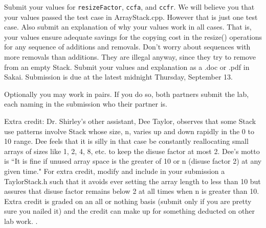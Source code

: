 \documentclass[]{article}
\begin{document}
Submit your values for \verb|resizeFactor|, \verb|ccfa|, and \verb|ccfr|.  We will believe you that your values passed the test case in ArrayStack.cpp.  However that is just one test case.  Also submit an explanation of why your values work in all cases.  That is, your values ensure adequate savings for the copying cost in the resize() operations for any sequence of additions and removals.  Don't worry about sequences with more removals than additions.  They are illegal anyway, since they try to remove from an empty Stack.  Submit your values and explanation as a .doc or .pdf in Sakai.
Submission is due at the latest midnight Thursday, September 13.

Optionally you may work in pairs.  If you do so, both partners submit the lab, each naming in the submission who their partner is. 

Extra credit: Dr. Shirley's other assistant, Dee Taylor, observes that some Stack use patterns involve Stack whose size, n, varies up and down rapidly in the 0 to 10 range.  Dee feels that it is silly in that case be constantly reallocating small arrays of sizes like 1, 2, 4, 8, etc. to keep the disuse factor at most 2.  Dee's motto is ``It is fine if unused array space is the greater of 10 or n (disuse factor 2) at any given time."
For extra credit, modify and include in your submission a TaylorStack.h such that it avoids ever setting the array length to less than 10 but assures that disuse factor remains below 2 at all times when n is greater than 10.  
Extra credit is graded on an all or nothing basis (submit only if you are pretty sure you nailed it) and the credit can make up for something deducted on other lab work. 
.
\end{document}
